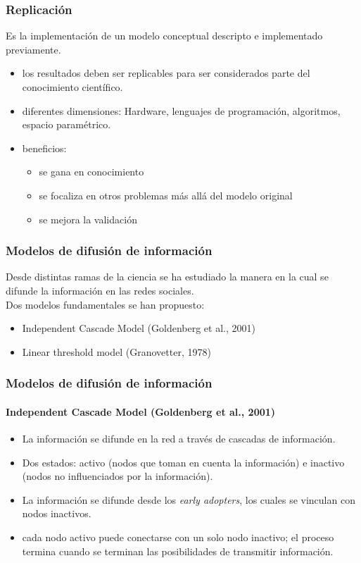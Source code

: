 \documentclass[11pt]{beamer}
\begin{document}
\begin{frame}
	\frametitle{Replicación} 
	Es la implementación de un modelo conceptual descripto e implementado previamente.
	\begin{itemize}
		\item los resultados deben ser replicables para ser considerados parte del conocimiento científico.
		\item diferentes dimensiones: Hardware, lenguajes de programación, algoritmos, espacio paramétrico.
		\item beneficios: 
		\begin{itemize}
			\item se gana en conocimiento
			\item se focaliza en otros problemas más allá del modelo original
			\item se mejora la validación
		\end{itemize}
	\end{itemize}
\end{frame}

\begin{frame}
	\frametitle{Modelos de difusión de información}
	Desde distintas ramas de la ciencia se ha estudiado la manera en la cual se difunde la información en las redes sociales.\\
	Dos modelos fundamentales se han propuesto:
	\begin{itemize}
		\item Independent Cascade Model (Goldenberg et al., 2001)
		\item Linear threshold model (Granovetter, 1978)
	\end{itemize}
\end{frame}

\begin{frame}
	\frametitle{Modelos de difusión de información}
	\framesubtitle{Independent Cascade Model (Goldenberg et al., 2001)}
	\begin{itemize}
			\item La información se difunde en la red a través de cascadas de información.
			\item Dos estados: activo (nodos que toman en cuenta la información) e inactivo (nodos no influenciados por la información).
			\item La información se difunde desde los \textit{early adopters}, los cuales se vinculan con nodos inactivos.
			\item cada nodo activo puede conectarse con un solo nodo inactivo; el proceso termina cuando se terminan las posibilidades de transmitir información.
	\end{itemize}
\end{frame}
\end{document}

